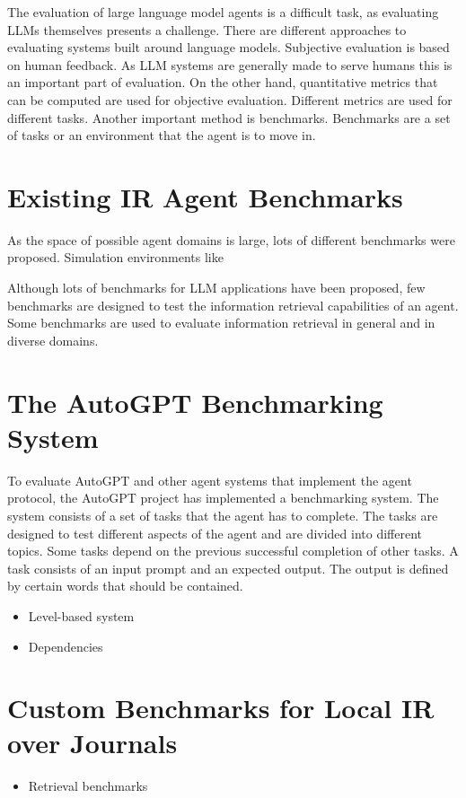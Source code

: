 \documentclass[../main.tex]{subfiles}
\begin{document}
The evaluation of large language model agents is a difficult task,
as evaluating LLMs themselves presents a challenge.
There are different approaches to evaluating systems built around language models.
Subjective evaluation is based on human feedback.
As LLM systems are generally made to serve humans this is an important part of evaluation.
On the other hand,
quantitative metrics that can be computed are used for objective evaluation.
Different metrics are used for different tasks. Another important method is benchmarks.
Benchmarks are a set of tasks or an environment that the agent is to move in.

\section{Existing IR Agent Benchmarks}

As the space of possible agent domains is large, lots of different benchmarks were proposed.
Simulation environments like

Although lots of benchmarks for LLM applications have been proposed,
few benchmarks are designed to test the information retrieval capabilities of an agent.
Some benchmarks are used to evaluate information retrieval in general and in diverse domains. %

\section{The AutoGPT Benchmarking System}

To evaluate AutoGPT and other agent systems that implement the agent protocol, the AutoGPT project has implemented a benchmarking system.
The system consists of a set of tasks that the agent has to complete. The tasks are designed to test different aspects of the agent and are divided into different topics.
Some tasks depend on the previous successful completion of other tasks. A task consists of an input prompt and an expected output.
The output is defined by certain words that should be contained.

\begin{itemize}
    \item Level-based system
    \item Dependencies
\end{itemize}

\section{Custom Benchmarks for Local IR over Journals}

\begin{itemize}
    \item Retrieval benchmarks
\end{itemize}
\end{document}
